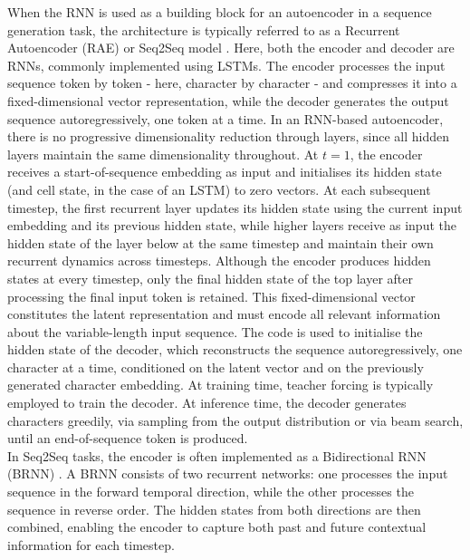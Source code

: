 \documentclass[Main.tex]{subfiles}
\begin{document}
When the RNN is used as a building block for an autoencoder in a sequence generation task, the architecture is typically referred to as a Recurrent Autoencoder (RAE) or Seq2Seq model \cite{sutskever_sequence_2014}. Here, both the encoder and decoder are RNNs, commonly implemented using LSTMs. The encoder processes the input sequence token by token - here, character by character - and compresses it into a fixed-dimensional vector representation, while the decoder generates the output sequence autoregressively, one token at a time. In an RNN-based autoencoder, there is no progressive dimensionality reduction through layers, since all hidden layers maintain the same dimensionality throughout. At $t=1$, the encoder receives a start-of-sequence embedding as input and initialises its hidden state (and cell state, in the case of an LSTM) to zero vectors. At each subsequent timestep, the first recurrent layer updates its hidden state using the current input embedding and its previous hidden state, while higher layers receive as input the hidden state of the layer below at the same timestep and maintain their own recurrent dynamics across timesteps. Although the encoder produces hidden states at every timestep, only the final hidden state of the top layer after processing the final input token is retained. This fixed-dimensional vector constitutes the latent representation and must encode all relevant information about the variable-length input sequence. The code is used to initialise the hidden state of the decoder, which reconstructs the sequence autoregressively, one character at a time, conditioned on the latent vector and on the previously generated character embedding. At training time, teacher forcing is typically employed to train the decoder. At inference time, the decoder generates characters greedily, via sampling from the output distribution or via beam search, until an end-of-sequence token is produced.\\

In Seq2Seq tasks, the encoder is often implemented as a Bidirectional RNN (BRNN) \cite{schuster_bidirectional_1997}. A BRNN consists of two recurrent networks: one processes the input sequence in the forward temporal direction, while the other processes the sequence in reverse order. The hidden states from both directions are then combined, enabling the encoder to capture both past and future contextual information for each timestep.\\
\end{document}

